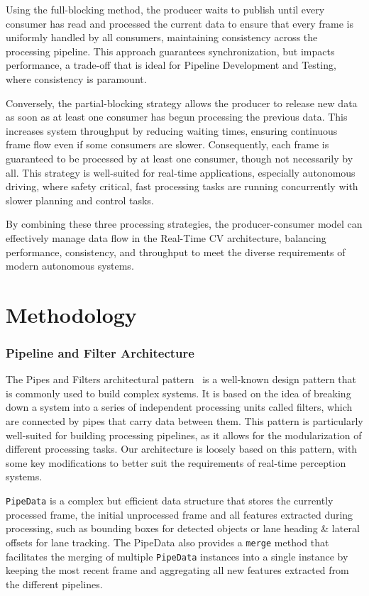 \documentclass[conference]{IEEEtran}
\begin{document}
Using the full-blocking method, the producer waits to publish until every consumer has read and processed the current data to ensure that every frame is uniformly handled by all consumers, maintaining consistency across the processing pipeline.
This approach guarantees synchronization, but impacts performance, a trade-off that is ideal for Pipeline Development and Testing, where consistency is paramount.

Conversely, the partial-blocking strategy allows the producer to release new data as soon as at least one consumer has begun processing the previous data.
This increases system throughput by reducing waiting times, ensuring continuous frame flow even if some consumers are slower.
Consequently, each frame is guaranteed to be processed by at least one consumer, though not necessarily by all.
This strategy is well-suited for real-time applications, especially autonomous driving, where safety critical, fast processing tasks are running concurrently with slower planning and control tasks.

By combining these three processing strategies, the producer-consumer model can effectively manage data flow in the Real-Time CV architecture, balancing performance, consistency, and throughput to meet the diverse requirements of modern autonomous systems.

\section{Methodology}

\subsubsection{Pipeline and Filter Architecture}

The Pipes and Filters architectural pattern~\cite{meunier1995pipes} is a well-known design pattern that is commonly used to build complex systems.
It is based on the idea of breaking down a system into a series of independent processing units called filters, which are connected by pipes that carry data between them.
This pattern is particularly well-suited for building processing pipelines, as it allows for the modularization of different processing tasks.
Our architecture is loosely based on this pattern, with some key modifications to better suit the requirements of real-time perception systems.

\texttt{PipeData} is a complex but efficient data structure that stores the currently processed frame, the initial unprocessed frame and all features extracted during processing, such as bounding boxes for detected objects or lane heading \& lateral offsets for lane tracking.
The PipeData also provides a \texttt{merge} method that facilitates the merging of multiple \texttt{PipeData} instances into a single instance by keeping the most recent frame and aggregating all new features extracted from the different pipelines.
\end{document}
